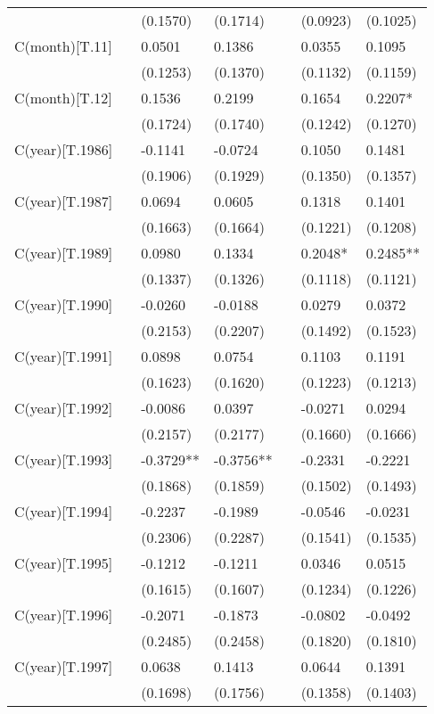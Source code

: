 \begin{tabular}{lllllll}
 &  & (0.1570) & (0.1714) &  & (0.0923) & (0.1025) \\
C(month)[T.11] &  & 0.0501 & 0.1386 &  & 0.0355 & 0.1095 \\
 &  & (0.1253) & (0.1370) &  & (0.1132) & (0.1159) \\
C(month)[T.12] &  & 0.1536 & 0.2199 &  & 0.1654 & 0.2207* \\
 &  & (0.1724) & (0.1740) &  & (0.1242) & (0.1270) \\
C(year)[T.1986] &  & -0.1141 & -0.0724 &  & 0.1050 & 0.1481 \\
 &  & (0.1906) & (0.1929) &  & (0.1350) & (0.1357) \\
C(year)[T.1987] &  & 0.0694 & 0.0605 &  & 0.1318 & 0.1401 \\
 &  & (0.1663) & (0.1664) &  & (0.1221) & (0.1208) \\
C(year)[T.1989] &  & 0.0980 & 0.1334 &  & 0.2048* & 0.2485** \\
 &  & (0.1337) & (0.1326) &  & (0.1118) & (0.1121) \\
C(year)[T.1990] &  & -0.0260 & -0.0188 &  & 0.0279 & 0.0372 \\
 &  & (0.2153) & (0.2207) &  & (0.1492) & (0.1523) \\
C(year)[T.1991] &  & 0.0898 & 0.0754 &  & 0.1103 & 0.1191 \\
 &  & (0.1623) & (0.1620) &  & (0.1223) & (0.1213) \\
C(year)[T.1992] &  & -0.0086 & 0.0397 &  & -0.0271 & 0.0294 \\
 &  & (0.2157) & (0.2177) &  & (0.1660) & (0.1666) \\
C(year)[T.1993] &  & -0.3729** & -0.3756** &  & -0.2331 & -0.2221 \\
 &  & (0.1868) & (0.1859) &  & (0.1502) & (0.1493) \\
C(year)[T.1994] &  & -0.2237 & -0.1989 &  & -0.0546 & -0.0231 \\
 &  & (0.2306) & (0.2287) &  & (0.1541) & (0.1535) \\
C(year)[T.1995] &  & -0.1212 & -0.1211 &  & 0.0346 & 0.0515 \\
 &  & (0.1615) & (0.1607) &  & (0.1234) & (0.1226) \\
C(year)[T.1996] &  & -0.2071 & -0.1873 &  & -0.0802 & -0.0492 \\
 &  & (0.2485) & (0.2458) &  & (0.1820) & (0.1810) \\
C(year)[T.1997] &  & 0.0638 & 0.1413 &  & 0.0644 & 0.1391 \\
 &  & (0.1698) & (0.1756) &  & (0.1358) & (0.1403) \\

\end{tabular}
